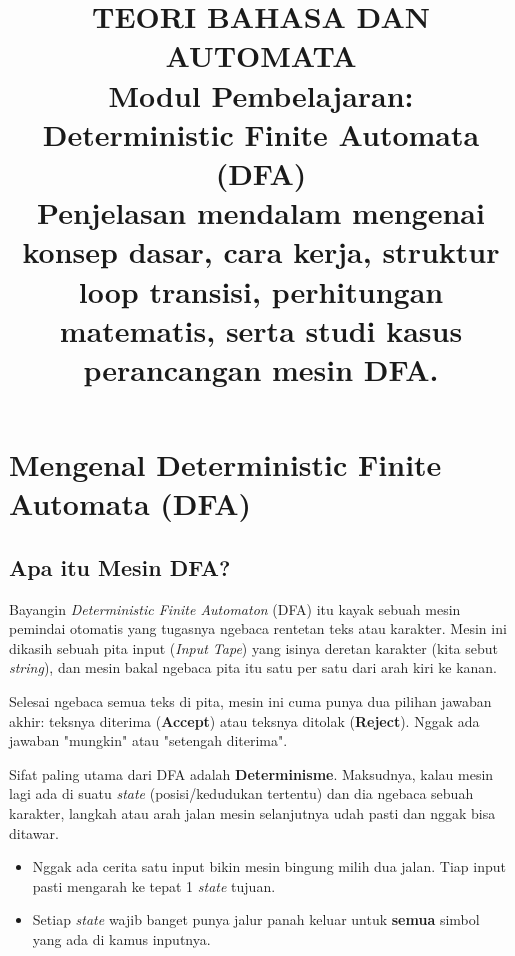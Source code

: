 \documentclass[12pt,a4paper]{article}
\title{
  {\LARGE\bfseries TEORI BAHASA DAN AUTOMATA}\\[0.5em]
  {\large Modul Pembelajaran: Deterministic Finite Automata (DFA)}\\[0.8em]
  {\normalsize Penjelasan mendalam mengenai konsep dasar, cara kerja, struktur loop transisi, perhitungan matematis, serta studi kasus perancangan mesin DFA.}
}
\author{}
\date{}
\begin{document}
\maketitle
\thispagestyle{fancy}
\tableofcontents
\newpage


\section{Mengenal Deterministic Finite Automata (DFA)}

\subsection{Apa itu Mesin DFA?}
Bayangin \textit{Deterministic Finite Automaton} (DFA) itu kayak sebuah mesin pemindai otomatis yang tugasnya ngebaca rentetan teks atau karakter. Mesin ini dikasih sebuah pita input (\textit{Input Tape}) yang isinya deretan karakter (kita sebut \textit{string}), dan mesin bakal ngebaca pita itu satu per satu dari arah kiri ke kanan.

Selesai ngebaca semua teks di pita, mesin ini cuma punya dua pilihan jawaban akhir: teksnya diterima (\textbf{Accept}) atau teksnya ditolak (\textbf{Reject}). Nggak ada jawaban "mungkin" atau "setengah diterima".

Sifat paling utama dari DFA adalah \textbf{Determinisme}. Maksudnya, kalau mesin lagi ada di suatu \textit{state} (posisi/kedudukan tertentu) dan dia ngebaca sebuah karakter, langkah atau arah jalan mesin selanjutnya udah pasti dan nggak bisa ditawar.
\begin{itemize}
    \item Nggak ada cerita satu input bikin mesin bingung milih dua jalan. Tiap input pasti mengarah ke tepat 1 \textit{state} tujuan.
    \item Setiap \textit{state} wajib banget punya jalur panah keluar untuk \textbf{semua} simbol yang ada di kamus inputnya.
\end{itemize}
\end{document}
